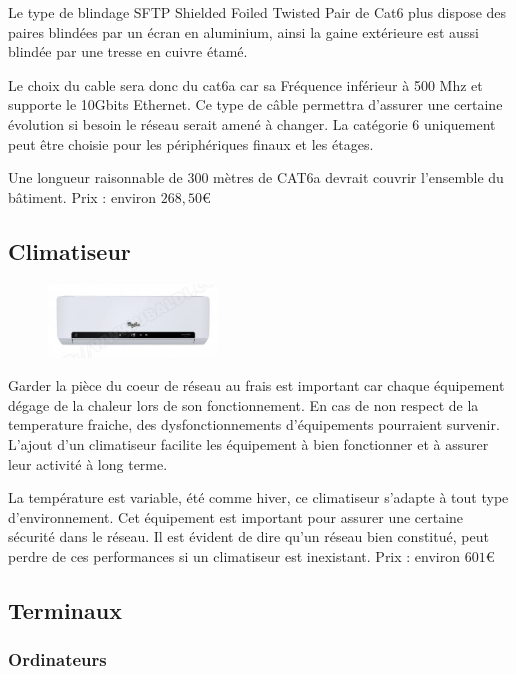 Le type de blindage SFTP Shielded Foiled Twisted Pair de Cat6  plus dispose des paires blindées par un écran en aluminium, ainsi la gaine extérieure est aussi blindée par une tresse en cuivre étamé.

Le choix du cable sera donc du cat6a car sa Fréquence inférieur à 500 Mhz et supporte le 10Gbits Ethernet. Ce type de câble permettra d'assurer une certaine évolution si besoin le réseau serait amené à changer.
La catégorie 6 uniquement peut être choisie pour les périphériques finaux  et les étages.

Une longueur raisonnable de 300 mètres de CAT6a devrait couvrir l'ensemble du bâtiment.
Prix : environ $ 268,50 \euro $



\subsection{Climatiseur}

\begin{figure}[!ht]
    \center
    \includegraphics[width=0.4\textwidth]{./images/28.png}
\end{figure}

Garder la pièce du coeur de réseau au frais est important car chaque équipement dégage de la chaleur lors de son fonctionnement. En cas de non respect de la temperature fraiche, des dysfonctionnements d'équipements pourraient survenir. L'ajout d'un climatiseur facilite les équipement à bien fonctionner et à assurer leur activité à long terme.

La température est variable, été comme hiver, ce climatiseur s'adapte à tout type d'environnement.
Cet équipement est important pour assurer une certaine sécurité dans le réseau. Il est évident de dire qu'un réseau bien constitué, peut perdre de ces performances si un climatiseur est inexistant.
Prix : environ $ 601 \euro $



\subsection{Terminaux}

\subsubsection{Ordinateurs}



